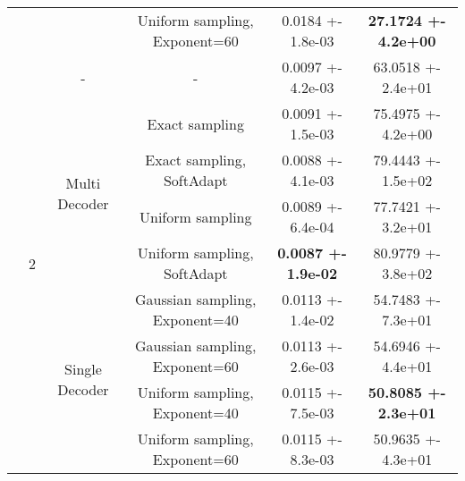 \begin{tabular}{||c|c|c|c|c|c||}
\cline{4-6}
 &  &  & Uniform sampling, Exponent=60 & 0.0184 +- 1.8e-03 & \textbf{27.1724 +- 4.2e+00} \\
\cline{4-6}
\cline{3-6}
\cline{2-6}
 & \multirow{9}{*}{2} & \multirow{1}{*}{-} & - & 0.0097 +- 4.2e-03 & 63.0518 +- 2.4e+01 \\
\cline{4-6}
\cline{3-6}
 &  & \multirow{4}{*}{Multi Decoder} & Exact sampling & 0.0091 +- 1.5e-03 & 75.4975 +- 4.2e+00 \\
\cline{4-6}
 &  &  & Exact sampling, SoftAdapt & 0.0088 +- 4.1e-03 & 79.4443 +- 1.5e+02 \\
\cline{4-6}
 &  &  & Uniform sampling & 0.0089 +- 6.4e-04 & 77.7421 +- 3.2e+01 \\
\cline{4-6}
 &  &  & Uniform sampling, SoftAdapt & \textbf{0.0087 +- 1.9e-02} & 80.9779 +- 3.8e+02 \\
\cline{4-6}
\cline{3-6}
 &  & \multirow{4}{*}{Single Decoder} & Gaussian sampling, Exponent=40 & 0.0113 +- 1.4e-02 & 54.7483 +- 7.3e+01 \\
\cline{4-6}
 &  &  & Gaussian sampling, Exponent=60 & 0.0113 +- 2.6e-03 & 54.6946 +- 4.4e+01 \\
\cline{4-6}
 &  &  & Uniform sampling, Exponent=40 & 0.0115 +- 7.5e-03 & \textbf{50.8085 +- 2.3e+01} \\
\cline{4-6}
 &  &  & Uniform sampling, Exponent=60 & 0.0115 +- 8.3e-03 & 50.9635 +- 4.3e+01 \\
\cline{4-6}
\cline{3-6}
\cline{2-6}
\hline
\hline
\end{tabular}
